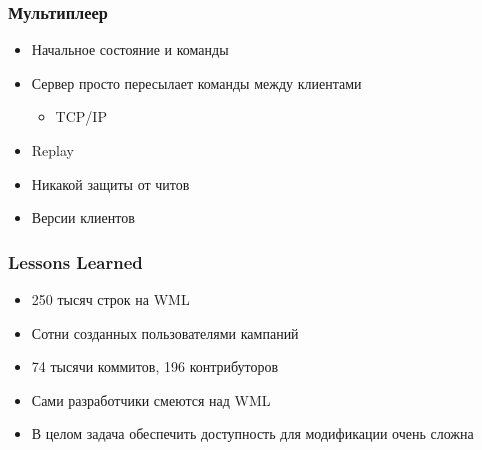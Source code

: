 \documentclass{../../slides-style}
\begin{document}
    \begin{frame}
        \frametitle{Мультиплеер}
        \begin{itemize}
            \item Начальное состояние и команды
            \item Сервер просто пересылает команды между клиентами
            \begin{itemize}
                \item TCP/IP
            \end{itemize}
            \item Replay
            \item Никакой защиты от читов
            \item Версии клиентов
        \end{itemize}
    \end{frame}

    \begin{frame}
        \frametitle{Lessons Learned}
        \begin{itemize}
            \item 250 тысяч строк на WML
            \item Сотни созданных пользователями кампаний
            \item 74 тысячи коммитов, 196 контрибуторов
            \item Сами разработчики смеются над WML
            \item В целом задача обеспечить доступность для модификации очень сложна
        \end{itemize}
    \end{frame}
\end{document}
